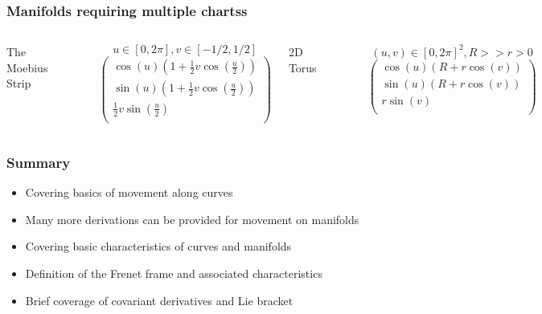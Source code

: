 \documentclass[10pt]{beamer}
\begin{document}
\begin{frame}
  \frametitle{Manifolds requiring multiple chartss}
  \begin{columns}
    \column{6cm}
    \centerline{\Large The Moebius Strip}\\
    \centerline{\includegraphics[width=4cm]{moebius-strip}}
    \begin{center}
      \[ u \in [0, 2 \pi], v \in [-1/2, 1/2] \]
      \[
        \left(
          \begin{array}{c}
            \cos(u) \left( 1+\frac{1}{2} v \cos \left(\frac{u}{2}\right)\right)\\
            \sin(u) \left( 1+\frac{1}{2} v \cos \left(\frac{u}{2}\right)\right)\\
            \frac{1}{2} v \sin \left(\frac{u}{2} \right)\\ 
          \end{array}
        \right)
      \]
    \end{center}
    \column{6cm}
    \centerline{\Large 2D Torus}\\
    \centerline{\includegraphics[width=4cm]{torus}}
    \begin{center}
      \[ (u,v) \in [0,2 \pi]^2, R>> r > 0 \]
      \[ 
        \left(
          \begin{array}{c}
            \cos(u) \left( R + r \cos(v) \right)\\
            \sin(u) \left( R + r \cos(v) \right)\\
            r \sin(v)\\
          \end{array}
        \right)
      \]
    \end{center}
  \end{columns}
 \end{frame}

\begin{frame}
  \frametitle{Summary}
  \begin{itemize}
  \item Covering basics of movement along curves
  \item Many more derivations can be provided for movement on manifolds
  \item Covering basic characteristics of curves and manifolds
  \item Definition of the Frenet frame and associated characteristics
  \item Brief coverage of covariant derivatives and Lie bracket
  \end{itemize}
\end{frame}
\end{document}

